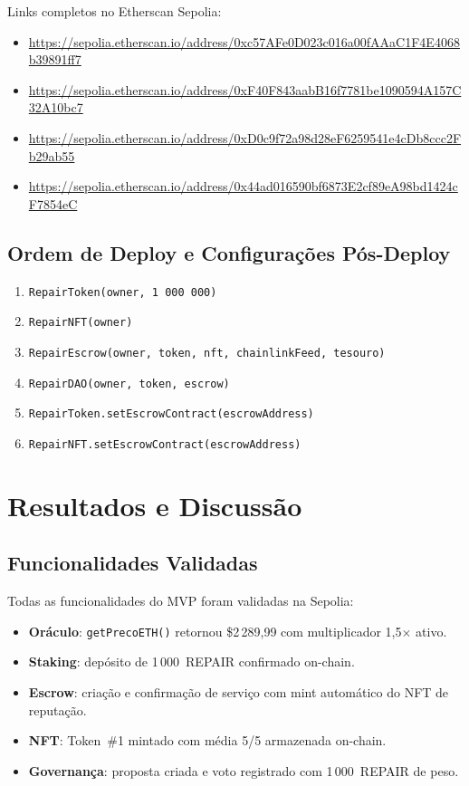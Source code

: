 \documentclass[
    12pt,
    a4paper,
    oneside,
    brazil,
    sumario=tradicional
]{abntex2}
\begin{document}
Links completos no Etherscan Sepolia:
\begin{itemize}
    \item \url{https://sepolia.etherscan.io/address/0xc57AFe0D023c016a00fAAaC1F4E4068b39891ff7}
    \item \url{https://sepolia.etherscan.io/address/0xF40F843aabB16f7781be1090594A157C32A10bc7}
    \item \url{https://sepolia.etherscan.io/address/0xD0c9f72a98d28eF6259541e4cDb8ccc2Fb29ab55}
    \item \url{https://sepolia.etherscan.io/address/0x44ad016590bf6873E2cf89eA98bd1424cF7854eC}
\end{itemize}

\subsection{Ordem de Deploy e Configurações Pós-Deploy}

\begin{enumerate}
    \item \texttt{RepairToken(owner, 1\,000\,000)}
    \item \texttt{RepairNFT(owner)}
    \item \texttt{RepairEscrow(owner, token, nft, chainlinkFeed, tesouro)}
    \item \texttt{RepairDAO(owner, token, escrow)}
    \item \texttt{RepairToken.setEscrowContract(escrowAddress)}
    \item \texttt{RepairNFT.setEscrowContract(escrowAddress)}
\end{enumerate}

\section{Resultados e Discussão}

\subsection{Funcionalidades Validadas}

Todas as funcionalidades do MVP foram validadas na Sepolia:

\begin{itemize}
    \item \textbf{Oráculo}: \texttt{getPrecoETH()} retornou \$2\,289,99
    com multiplicador 1,5$\times$ ativo.
    \item \textbf{Staking}: depósito de 1\,000~REPAIR confirmado on-chain.
    \item \textbf{Escrow}: criação e confirmação de serviço
    com mint automático do NFT de reputação.
    \item \textbf{NFT}: Token~\#1 mintado com média 5/5 armazenada on-chain.
    \item \textbf{Governança}: proposta criada e voto registrado com
    1\,000~REPAIR de peso.
\end{itemize}
\end{document}
